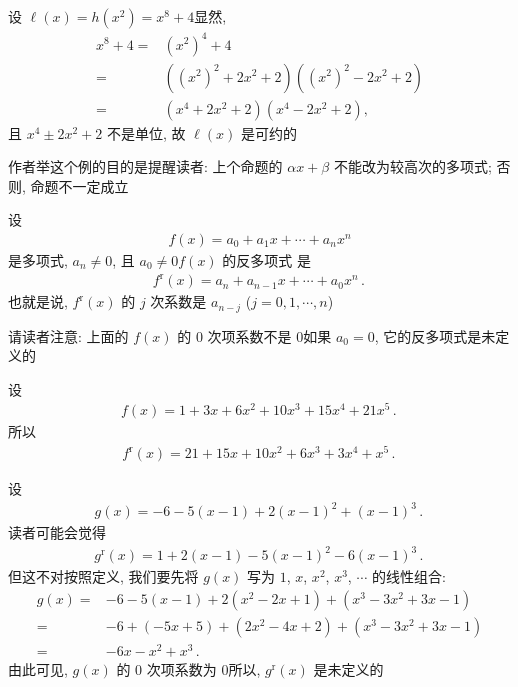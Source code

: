 \begin{remark}
    设 $\ell (x) = h(x^2) = x^8 + 4$\period 显然,
    \begin{align*}
        x^8 + 4
        = {} & (x^2)^4 + 4                               \\
        = {} & ((x^2)^2 + 2x^2 + 2) ((x^2)^2 - 2x^2 + 2) \\
        = {} & (x^4 + 2x^2 + 2) (x^4 - 2x^2 + 2),
    \end{align*}
    且 $x^4 \pm 2x^2 + 2$ 不是单位, 故 $\ell (x)$ 是可约的\period

    作者举这个例的目的是提醒读者: 上个命题的 $\alpha x + \beta$ 不能改为较高次的多项式; 否则, 命题不一定成立\period
\end{remark}

\begin{definition}
    设
    \begin{align*}
        f(x) = a_0 + a_1 x + \cdots + a_n x^n
    \end{align*}
    是多项式, $a_n \neq 0$, 且 $a_0 \neq 0$\period $f(x)$ 的反多项式  是
    \begin{align*}
        f^{\mathrm{r}} (x) = a_n + a_{n-1} x + \cdots + a_0 x^n \period
    \end{align*}
    也就是说, $f^{\mathrm{r}} (x)$ 的 $j$ 次系数是 $a_{n-j}$ ($j = 0,1,\cdots,n$)\period

    请读者注意: 上面的 $f(x)$ 的 $0$ 次项系数不是 $0$\period 如果 $a_0 = 0$, 它的反多项式是未定义的\period
\end{definition}

\begin{example}
    设
    \begin{align*}
        f(x) = 1 + 3x + 6x^2 + 10x^3 + 15x^4 + 21x^5 \period
    \end{align*}
    所以
    \begin{align*}
        f^{\mathrm{r}} (x) = 21 + 15x + 10x^2 + 6x^3 + 3x^4 + x^5 \period
    \end{align*}
\end{example}

\begin{example}
    设
    \begin{align*}
        g(x) = -6 - 5 (x - 1) + 2 (x - 1)^2 + (x - 1)^3 \period
    \end{align*}
    读者可能会觉得
    \begin{align*}
        g^{\mathrm{r}} (x) = 1 + 2 (x - 1) - 5 (x - 1)^2 - 6 (x - 1)^3 \period
    \end{align*}
    但这不对\period 按照定义, 我们要先将 $g(x)$ 写为 $1$, $x$, $x^2$, $x^3$, $\cdots$ 的线性组合:
    \begin{align*}
        g(x)
        = {} & -6 - 5(x - 1) + 2 (x^2 - 2x + 1) + (x^3 - 3x^2 + 3x - 1) \\
        = {} & -6 + (-5x + 5) + (2x^2 - 4x + 2) + (x^3 - 3x^2 + 3x - 1) \\
        = {} & -6x - x^2 + x^3 \period
    \end{align*}
    由此可见, $g(x)$ 的 $0$ 次项系数为 $0$\period 所以, $g^{\mathrm{r}} (x)$ 是未定义的\period
\end{example}

